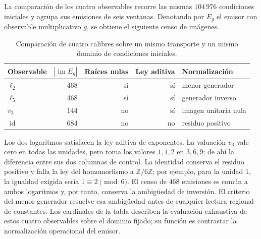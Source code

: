 La comparación de los cuatro observables recorre las mismas
\(104\,976\) condiciones iniciales y agrupa sus emisiones de seis
ventanas. Denotando por \(E_g\) el emisor con observable multiplicativo
\(g\), se obtiene el siguiente censo de imágenes.
\begin{table}[htbp]
\centering
\small
\begin{tabular}{@{}lrrrl@{}}
\toprule
Observable & \(|\operatorname{im}E_g|\) & Raíces nulas
 & Ley aditiva & Normalización\\
\midrule
\(\ell_2\)&468&sí&sí&menor generador\\
\(\ell_5\)&468&sí&sí&generador inverso\\
\(v_3\)&144&no&sí&imagen unitaria nula\\
\(\operatorname{id}\)&684&no&no&residuo positivo\\
\bottomrule
\end{tabular}
\caption{Comparación de cuatro calibres sobre un mismo transporte y un mismo dominio de condiciones iniciales.}
\label{mg05:tabla-calibres}
\end{table}

Los dos logaritmos satisfacen la ley aditiva de exponentes. La valuación
\(v_3\) vale cero en todas las unidades, pero toma los valores
\(1,1,2\) en \(3,6,9\); de ahí la diferencia entre sus dos columnas
de control. La identidad conserva el residuo positivo y falla la ley
del homomorfismo a \(\mathbb Z/6\mathbb Z\); por ejemplo, para
la unidad \(1\), la igualdad exigida sería \(1\equiv2\pmod6\).
El censo de \(468\) emisiones es común a ambos logaritmos y, por
tanto, conserva la ambigüedad de inversión. El criterio del menor
generador resuelve esa ambigüedad antes de cualquier lectura regional
de constantes. Los cardinales de la tabla describen la evaluación
exhaustiva de estos cuatro observables sobre el dominio fijado; su
función es contrastar la normalización operacional del emisor.
